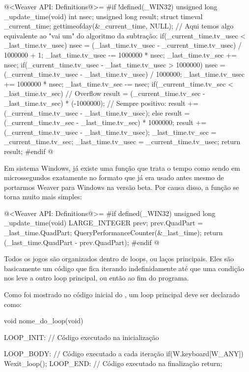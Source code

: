 \iniciocodigo
@<Weaver API: Definitions@>=
#if !defined(_WIN32)
unsigned long _update_time(void){
  int nsec;
  unsigned long result;
  struct timeval _current_time;
  gettimeofday(&_current_time, NULL);
  // Aqui temos algo equivalente ao "vai um" do algoritmo da subtração:
  if(_current_time.tv_usec < _last_time.tv_usec){
    nsec = (_last_time.tv_usec - _current_time.tv_usec) / 1000000 + 1;
    _last_time.tv_usec -= 1000000 * nsec;
    _last_time.tv_sec += nsec;
  }
  if(_current_time.tv_usec - _last_time.tv_usec > 1000000){
    nsec = (_current_time.tv_usec - _last_time.tv_usec) / 1000000;
    _last_time.tv_usec += 1000000 * nsec;
    _last_time.tv_sec -= nsec;
  }
  if(_current_time.tv_sec < _last_time.tv_sec){
    // Overflow
    result = (_current_time.tv_sec - _last_time.tv_sec) * (-1000000);
    // Sempre positivo:
    result += (_current_time.tv_usec - _last_time.tv_usec);
  }
  else{
    result = (_current_time.tv_sec - _last_time.tv_sec) * 1000000;
    result += (_current_time.tv_usec - _last_time.tv_usec);
  }
  _last_time.tv_sec = _current_time.tv_sec;
  _last_time.tv_usec = _current_time.tv_usec;
  return result;
}
#endif
@
\fimcodigo

Em sistema Windows, já existe uma função que trata o tempo como sendo
em microssegundos exatamente no formato que já era usado antes mesmo
de portarmos Weaver para Windows na versão beta. Por causa disso, a
função se torna muito mais simples:

\iniciocodigo
@<Weaver API: Definitions@>=
#if defined(_WIN32)
unsigned long _update_time(void){
  LARGE_INTEGER prev;
  prev.QuadPart = _last_time.QuadPart;
  QueryPerformanceCounter(&_last_time);
  return (_last_time.QuadPart - prev.QuadPart);
}
#endif
@
\fimcodigo


Todos os jogos são organizados dentro de loops, ou laços
principais. Eles são basicamente um código que fica iterando
indefinidamente até que uma condição nos leve a outro loop principal,
ou então ao fim do programa.

Como foi mostrado no código inicial do , um loop
principal deve ser declarado como:

\alinhaverbatim
void nome\_do\_loop(void){
 LOOP\_INIT: // Código executado na inicialização

 LOOP\_BODY: // Código executado a cada iteração
    if(W.keyboard[W\_ANY])
        Wexit\_loop();
 LOOP\_END: // Código executado na finalização
    return;
}
\alinhanormal


